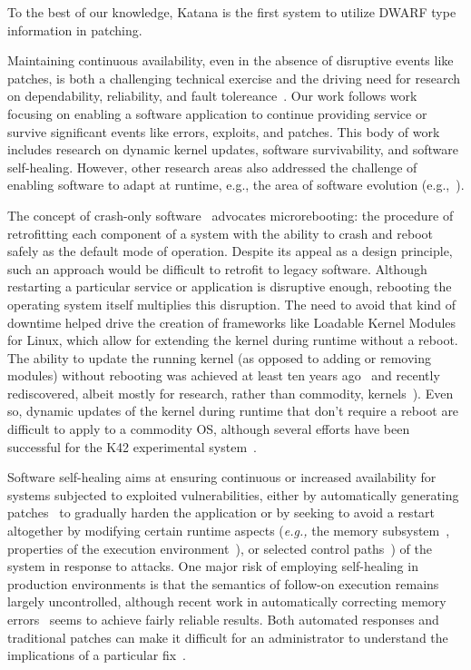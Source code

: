 To the best of our knowledge, Katana is the first system to utilize
DWARF type information in patching.

Maintaining continuous availability, even in the absence of disruptive
events like patches, is both a challenging technical exercise and the
driving need for research on dependability, reliability, and fault
tolereance~\cite{deltaexec}. 
Our work follows work focusing
 on enabling a software
application to continue providing service or survive significant
events like errors, exploits, and patches.  This body of work includes
research on dynamic kernel updates, software survivability, and
software self-healing. However, other research areas also addressed the
challenge of enabling software to adapt at runtime, e.g., the area
of software evolution (e.g.,~\cite{software-evolution}).

The concept of crash-only software~\cite{crashonly} advocates
microrebooting: the procedure of retrofitting each component of a
system with the ability to crash and reboot safely as the default mode
of operation.  Despite its appeal as a design principle, such an
approach would be difficult to retrofit to legacy software.
Although restarting a particular service or application is disruptive
enough, rebooting the operating system itself multiplies this
disruption.  
The need to avoid that kind of downtime helped drive the
creation of frameworks like Loadable Kernel Modules for Linux, which
allow for extending the kernel during runtime without a reboot.
The ability to update the running kernel (as opposed to adding
or removing modules) without rebooting was achieved at least ten years
ago~\cite{cesare1998} and recently rediscovered, albeit mostly for
research, rather than commodity,
kernels~\cite{nonLKMkernpatch,baumann2007osupdate,soules2003k42}).
Even so,
dynamic updates of the kernel during runtime that don't require a
reboot are difficult to apply to a commodity OS, although several
efforts have been successful for the K42 experimental
system~\cite{soules2003k42,baumann2005k42}.

Software self-healing aims at ensuring continuous or increased
availability for systems subjected to exploited vulnerabilities,
either by automatically generating
patches~\cite{weimer2009genetic,stelios2005usenix} to gradually harden
the application or by seeking to avoid a restart altogether by modifying
certain runtime aspects ({\it e.g.,} the memory
subsystem~\cite{rinard2004osdi}, properties of the execution
environment~\cite{rx2005sosp}), 
%
or selected control
paths~\cite{dira2005,locasto2007usenix}) of the system in response to
attacks.
One major risk of employing self-healing in production environments is
that the semantics of follow-on execution remains largely uncontrolled,
although recent work in automatically correcting memory
errors~\cite{exterminator2008cacm} seems to achieve fairly reliable
results.  Both automated responses and traditional patches can make it
difficult for an administrator to understand the implications of a
particular fix~\cite{rinard.ppp}.

